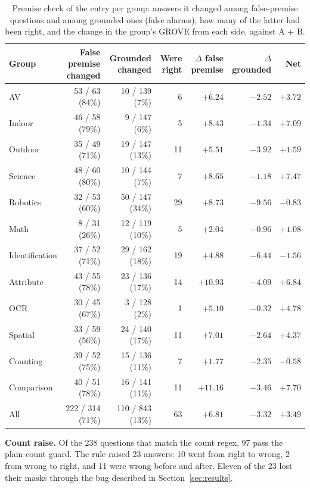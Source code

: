 \documentclass{article}
\newcommand{\ours}{\rowcolor{oursbg}}
\begin{document}
\begin{table}[!htbp]
\centering\scriptsize
\caption{Premise check of the entry per group: answers it changed among false-premise questions and among grounded ones (false alarms),
how many of the latter had been right, and the change in the group's GROVE from each side, against A + B.}
\label{tab:prem}
\begin{tabular}{lrrrrrr}
\toprule
Group & False premise changed & Grounded changed & Were right & $\Delta$ false premise & $\Delta$ grounded & Net \\
\midrule
AV & 53 / 63 (84\%) & 10 / 139 (7\%) & 6 & $+6.24$ & $-2.52$ & $+3.72$ \\
Indoor & 46 / 58 (79\%) & 9 / 147 (6\%) & 5 & $+8.43$ & $-1.34$ & $+7.09$ \\
Outdoor & 35 / 49 (71\%) & 19 / 147 (13\%) & 11 & $+5.51$ & $-3.92$ & $+1.59$ \\
Science & 48 / 60 (80\%) & 10 / 144 (7\%) & 7 & $+8.65$ & $-1.18$ & $+7.47$ \\
Robotics & 32 / 53 (60\%) & 50 / 147 (34\%) & 29 & $+8.73$ & $-9.56$ & $-0.83$ \\
Math & 8 / 31 (26\%) & 12 / 119 (10\%) & 5 & $+2.04$ & $-0.96$ & $+1.08$ \\
\midrule
Identification & 37 / 52 (71\%) & 29 / 162 (18\%) & 19 & $+4.88$ & $-6.44$ & $-1.56$ \\
Attribute & 43 / 55 (78\%) & 23 / 136 (17\%) & 14 & $+10.93$ & $-4.09$ & $+6.84$ \\
OCR & 30 / 45 (67\%) & 3 / 128 (2\%) & 1 & $+5.10$ & $-0.32$ & $+4.78$ \\
Spatial & 33 / 59 (56\%) & 24 / 140 (17\%) & 11 & $+7.01$ & $-2.64$ & $+4.37$ \\
Counting & 39 / 52 (75\%) & 15 / 136 (11\%) & 7 & $+1.77$ & $-2.35$ & $-0.58$ \\
Comparison & 40 / 51 (78\%) & 16 / 141 (11\%) & 11 & $+11.16$ & $-3.46$ & $+7.70$ \\
\midrule
\ours All & 222 / 314 (71\%) & 110 / 843 (13\%) & 63 & $+6.81$ & $-3.32$ & $+3.49$ \\
\bottomrule
\end{tabular}
\end{table}

\textbf{Count raise.} Of the 238 questions that match the count regex, 97 pass the plain-count guard. The rule raised 23 answers:
10 went from right to wrong, 2 from wrong to right, and 11 were wrong before and after. Eleven of the 23 lost their masks through the
bug described in Section~\ref{sec:results}.
\end{document}
